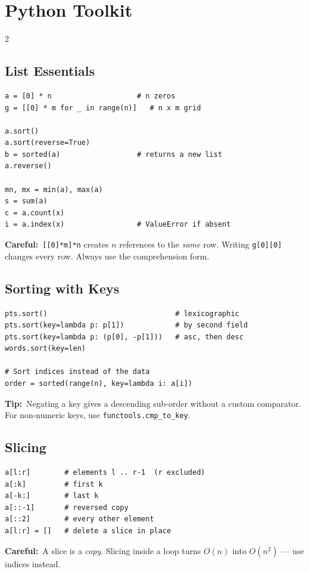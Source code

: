 \documentclass[10pt]{article}
\newcommand{\code}[1]{\texttt{\small #1}}
\newcommand{\tip}[1]{{\color{tipc}\footnotesize\textbf{Tip:}}~{\footnotesize #1}\par}
\newcommand{\warn}[1]{{\color{warnc}\footnotesize\textbf{Careful:}}~{\footnotesize #1}\par}
\begin{document}
\section{Python Toolkit}
\begin{multicols}{2}

\subsection{List Essentials}
\begin{lstlisting}
a = [0] * n                    # n zeros
g = [[0] * m for _ in range(n)]   # n x m grid

a.sort()
a.sort(reverse=True)
b = sorted(a)                  # returns a new list
a.reverse()

mn, mx = min(a), max(a)
s = sum(a)
c = a.count(x)
i = a.index(x)                 # ValueError if absent
\end{lstlisting}
\warn{\code{[[0]*m]*n} creates $n$ references to the \emph{same} row.
Writing \code{g[0][0]} changes every row. Always use the comprehension
form.}

\subsection{Sorting with Keys}
\begin{lstlisting}
pts.sort()                              # lexicographic
pts.sort(key=lambda p: p[1])            # by second field
pts.sort(key=lambda p: (p[0], -p[1]))   # asc, then desc
words.sort(key=len)

# Sort indices instead of the data
order = sorted(range(n), key=lambda i: a[i])
\end{lstlisting}
\tip{Negating a key gives a descending sub-order without a custom
comparator. For non-numeric keys, use \code{functools.cmp\_to\_key}.}

\subsection{Slicing}
\begin{lstlisting}
a[l:r]        # elements l .. r-1  (r excluded)
a[:k]         # first k
a[-k:]        # last k
a[::-1]       # reversed copy
a[::2]        # every other element
a[l:r] = []   # delete a slice in place
\end{lstlisting}
\warn{A slice is a \emph{copy}. Slicing inside a loop turns $O(n)$ into
$O(n^2)$ --- use indices instead.}


\end{multicols}
\end{document}
